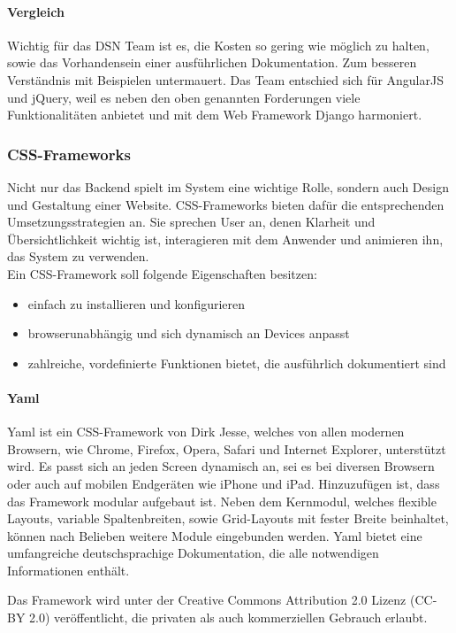 \paragraph{Vergleich}
Wichtig für das DSN Team ist es, die Kosten so gering wie möglich zu halten, sowie das Vorhandensein einer ausführlichen Dokumentation. Zum besseren Verständnis mit Beispielen untermauert. Das Team entschied sich für AngularJS und jQuery, weil es neben den oben genannten Forderungen viele Funktionalitäten anbietet und mit dem Web Framework Django harmoniert.

\subsubsection{CSS-Frameworks}
Nicht nur das Backend spielt im System eine wichtige Rolle, sondern auch Design und Gestaltung einer Website. CSS-Frameworks bieten dafür die entsprechenden Umsetzungsstrategien an. Sie sprechen User an, denen Klarheit und Übersichtlichkeit wichtig ist, interagieren mit dem Anwender und animieren ihn, das System zu verwenden. \\
Ein CSS-Framework soll folgende Eigenschaften besitzen:
\begin{itemize}
\item einfach zu installieren und konfigurieren
\item browserunabhängig und sich dynamisch an Devices anpasst
\item zahlreiche, vordefinierte Funktionen bietet, die ausführlich dokumentiert sind
\end{itemize}

\newpage

\paragraph{Yaml}
Yaml ist ein CSS-Framework von Dirk Jesse, welches von allen modernen Browsern, wie Chrome, Firefox, Opera, Safari und Internet Explorer, unterstützt wird. Es passt sich an jeden Screen dynamisch an, sei es bei diversen Browsern oder auch auf mobilen Endgeräten wie iPhone und iPad. Hinzuzufügen ist, dass das Framework modular aufgebaut ist. Neben dem Kernmodul, welches flexible Layouts, variable Spaltenbreiten, sowie Grid-Layouts mit fester Breite beinhaltet, können nach Belieben weitere Module eingebunden werden. Yaml bietet eine umfangreiche deutschsprachige Dokumentation, die alle notwendigen Informationen enthält. \cite{YAML}

Das Framework wird unter der Creative Commons Attribution 2.0 Lizenz (CC-BY 2.0) veröffentlicht, die privaten als auch kommerziellen Gebrauch erlaubt. \cite{CCBY}

